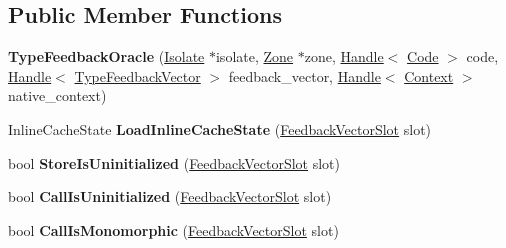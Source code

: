 \subsection*{Public Member Functions}
\begin{DoxyCompactItemize}
\item 
{\bfseries Type\+Feedback\+Oracle} (\hyperlink{classv8_1_1internal_1_1_isolate}{Isolate} $\ast$isolate, \hyperlink{classv8_1_1internal_1_1_zone}{Zone} $\ast$zone, \hyperlink{classv8_1_1internal_1_1_handle}{Handle}$<$ \hyperlink{classv8_1_1internal_1_1_code}{Code} $>$ code, \hyperlink{classv8_1_1internal_1_1_handle}{Handle}$<$ \hyperlink{classv8_1_1internal_1_1_type_feedback_vector}{Type\+Feedback\+Vector} $>$ feedback\+\_\+vector, \hyperlink{classv8_1_1internal_1_1_handle}{Handle}$<$ \hyperlink{classv8_1_1internal_1_1_context}{Context} $>$ native\+\_\+context)\hypertarget{classv8_1_1internal_1_1_type_feedback_oracle_ac2ac92140e09acee029f7d4ec85b1f8d}{}\label{classv8_1_1internal_1_1_type_feedback_oracle_ac2ac92140e09acee029f7d4ec85b1f8d}

\item 
Inline\+Cache\+State {\bfseries Load\+Inline\+Cache\+State} (\hyperlink{classv8_1_1internal_1_1_feedback_vector_slot}{Feedback\+Vector\+Slot} slot)\hypertarget{classv8_1_1internal_1_1_type_feedback_oracle_ad1e22eac35370e99613d85ef2b936cf2}{}\label{classv8_1_1internal_1_1_type_feedback_oracle_ad1e22eac35370e99613d85ef2b936cf2}

\item 
bool {\bfseries Store\+Is\+Uninitialized} (\hyperlink{classv8_1_1internal_1_1_feedback_vector_slot}{Feedback\+Vector\+Slot} slot)\hypertarget{classv8_1_1internal_1_1_type_feedback_oracle_a02cfd1321db22c4b051232489ffba297}{}\label{classv8_1_1internal_1_1_type_feedback_oracle_a02cfd1321db22c4b051232489ffba297}

\item 
bool {\bfseries Call\+Is\+Uninitialized} (\hyperlink{classv8_1_1internal_1_1_feedback_vector_slot}{Feedback\+Vector\+Slot} slot)\hypertarget{classv8_1_1internal_1_1_type_feedback_oracle_aceac321bb93600b620d9a5f63acd35b9}{}\label{classv8_1_1internal_1_1_type_feedback_oracle_aceac321bb93600b620d9a5f63acd35b9}

\item 
bool {\bfseries Call\+Is\+Monomorphic} (\hyperlink{classv8_1_1internal_1_1_feedback_vector_slot}{Feedback\+Vector\+Slot} slot)\hypertarget{classv8_1_1internal_1_1_type_feedback_oracle_aa939fa3a189417177b0394eaebe364b4}{}\label{classv8_1_1internal_1_1_type_feedback_oracle_aa939fa3a189417177b0394eaebe364b4}


\end{DoxyCompactItemize}
